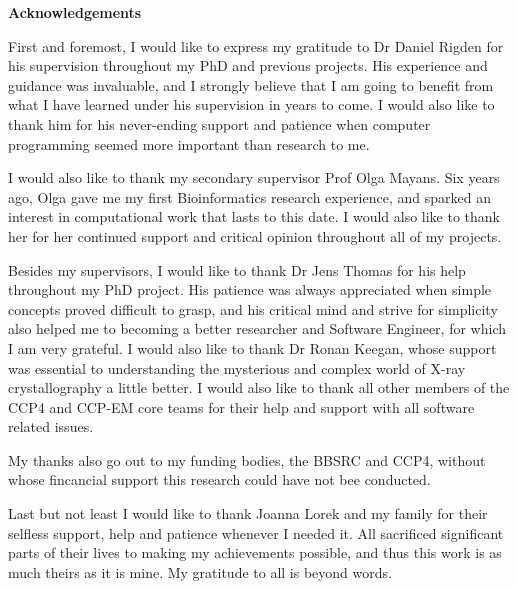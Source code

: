 \begin{center}
    \LARGE
    \textbf{Acknowledgements}
    \vspace{0.5cm}
\end{center}

First and foremost, I would like to express my gratitude to Dr Daniel Rigden for his supervision throughout my PhD and previous projects. His experience and guidance was invaluable, and I strongly believe that I am going to benefit from what I have learned under his supervision in years to come. I would also like to thank him for his never-ending support and patience when computer programming seemed more important than research to me.

I would also like to thank my secondary supervisor Prof Olga Mayans. Six years ago, Olga gave me my first Bioinformatics research experience, and sparked an interest in computational work that lasts to this date. I would also like to thank her for her continued support and critical opinion throughout all of my projects.

Besides my supervisors, I would like to thank Dr Jens Thomas for his help throughout my PhD project. His patience was always appreciated when simple concepts proved difficult to grasp, and his critical mind and strive for simplicity also helped me to becoming a better researcher and Software Engineer, for which I am very grateful. I would also like to thank Dr Ronan Keegan, whose support was essential to understanding the mysterious and complex world of X-ray crystallography a little better. I would also like to thank all other members of the CCP4 and CCP-EM core teams for their help and support with all software related issues.

My thanks also go out to my funding bodies, the BBSRC and CCP4, without whose fincancial support this research could have not bee conducted.

Last but not least I would like to thank Joanna Lorek and my family for their selfless support, help and patience whenever I needed it. All sacrificed significant parts of their lives to making my achievements possible, and thus this work is as much theirs as it is mine. My gratitude to all is beyond words.

